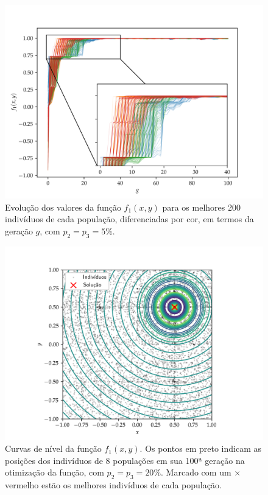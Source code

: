 \begin{figure}[p]
    \centering
    \includegraphics[width=\textwidth]{imagens/low_prob/evolution_damped_cossine.png}
    \caption{
        Evolução dos valores da função $ f_1(x,y) $ para os
        melhores 200 indivíduos de cada população, diferenciadas por cor, em termos da geração $g$,
        com $ p_2 = p_3 = 5\% $.
    }
    \label{fig:evolution_damped_cossine}
\end{figure}

\begin{figure}[p]
    \centering
    \includegraphics[width=\textwidth]{imagens/high_prob/contour_damped_cossine.png}
    \caption{
        Curvas de nível da função $f_1(x,y)$. Os pontos em preto indicam as posições dos indivíduos
        de 8 populações em sua 100ª geração na otimização da função, com $ p_2 = p_3 = 20\% $. 
        Marcado com um $\times$ vermelho estão os melhores indivíduos de cada população.
    }
    \label{fig:contour_damped_cossine_mut_20}
\end{figure}

